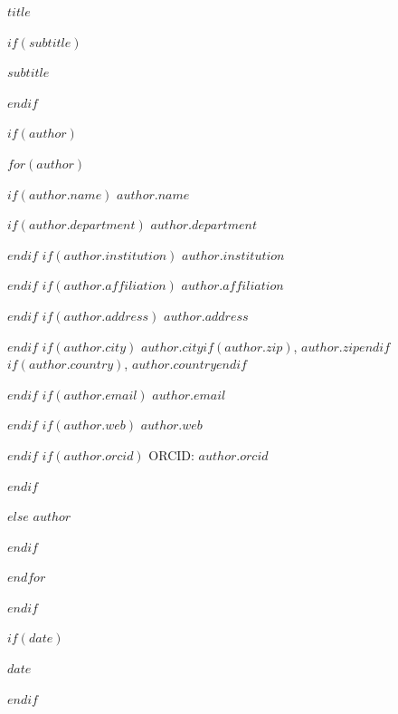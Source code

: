 \documentclass[12pt]{article}
\newif\ifjncanon
\begin{document}
\begin{titlepage}
\thispagestyle{empty}

\vspace*{0.06\textheight}
\begin{center}

{\LARGE\bfseries $title$\par}

$if(subtitle)$
\vspace{0.25em}
{\large $subtitle$\par}
$endif$

\vspace{2em}

\begin{singlespace}
{\normalsize

$if(author)$
\ifjncanon
\else
$for(author)$

$if(author.name)$
\textbf{$author.name$}\par
$if(author.department)$
$author.department$\par
$endif$
$if(author.institution)$
$author.institution$\par
$endif$
$if(author.affiliation)$
$author.affiliation$\par
$endif$
$if(author.address)$
$author.address$\par
$endif$
$if(author.city)$
$author.city$$if(author.zip)$, $author.zip$$endif$$if(author.country)$, $author.country$$endif$\par
$endif$
$if(author.email)$
\texttt{$author.email$}\par
$endif$
$if(author.web)$
$author.web$\par
$endif$
$if(author.orcid)$
ORCID: $author.orcid$\par
$endif$

$else$
\textbf{$author$}\par
$endif$

\vspace{0.75em}
$endfor$
\fi
$endif$

$if(date)$
\ifjncanon
\else
\vspace{0.5em}
\textit{$date$}\par
\fi
$endif$

}
\end{singlespace}
\end{center}
\end{titlepage}
\end{document}
